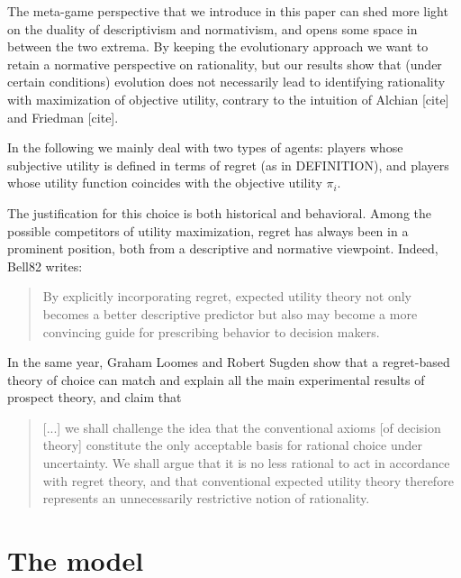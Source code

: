 \documentclass[fleqn,reqno,11pt]{article}
\begin{document}
The meta-game perspective that we introduce in this paper can shed more light on the duality of descriptivism and normativism, and opens
some space in between the two extrema. 
By keeping the evolutionary approach we want to retain a
normative perspective on rationality, but our results show that (under certain conditions)
evolution does not necessarily lead to identifying rationality with maximization of objective
utility, contrary to the intuition of Alchian [cite] and Friedman [cite].

In the following we mainly deal with two types of agents: players whose subjective utility is defined
in terms of regret (as in DEFINITION), and players whose utility
function coincides with the objective utility $\pi_i$. 

The justification for this choice is both historical and behavioral. Among
the possible competitors of utility maximization, regret has always been in a prominent
position, both from a descriptive and normative viewpoint. Indeed, Bell82 writes:
\begin{quote}
  By explicitly incorporating regret, expected utility theory not only becomes a better
  descriptive predictor but also may become a more convincing guide for prescribing behavior to
  decision makers.
\end{quote}
In the same year, Graham Loomes and Robert Sugden \citet{LoomesSugden1982:Regret-Theory:-} show that a regret-based theory of choice can match
and explain all the main experimental results of prospect theory, and claim that
\begin{quote} [...] we shall challenge the idea that the conventional axioms [of decision
  theory] constitute the only acceptable basis for rational choice under uncertainty. We shall
  argue that it is no less rational to act in accordance with regret theory, and that
  conventional expected utility theory therefore represents an unnecessarily restrictive notion
  of rationality. \hfill \citep{LoomesSugden1982:Regret-Theory:-}
\end{quote}









\section{The model}
\end{document}
